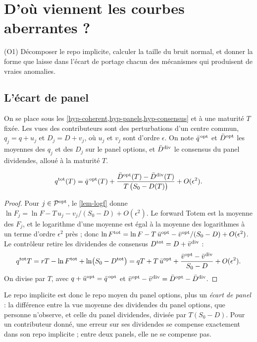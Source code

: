 \section{D'où viennent les courbes aberrantes ?}\label{sec-diagnostic}

\begin{objectif}
(O1) Décomposer le repo implicite, calculer la taille du bruit normal, et donner la forme que laisse dans l'écart de
portage chacun des mécanismes qui produisent de vraies anomalies.
\end{objectif}

\subsection{L'écart de panel}\label{sec-gap}
On se place sous les \cref{hyp-coherent,hyp-panels,hyp-consensus} et à une maturité $T$ fixée. Les vues des
contributeurs sont des perturbations d'un centre commun, $q_j=q+u_j$ et $D_j=D+v_j$, où $u_j$ et $v_j$ sont d'ordre
$\epsilon$. On note $\bar q^{\,\mathrm{opt}}$ et $\bar D^{\mathrm{opt}}$ les moyennes des $q_j$ et des $D_j$ sur le panel options, et $\bar D^{\mathrm{div}}$ le
consensus du panel dividendes, alloué à la maturité $T$.

\begin{proposition}\label{prop-gap}
\begin{equation}\label{eq-gap}
q^{\mathrm{tot}}(T)=\bar q^{\,\mathrm{opt}}(T)+\frac{\bar D^{\mathrm{opt}}(T)-\bar D^{\mathrm{div}}(T)}{T\,\bigl(S_0-D(T)\bigr)}+O(\epsilon^2).
\end{equation}
\end{proposition}
\begin{proof}
Pour $j\in\mathcal{P}^{\mathrm{opt}}$, le \cref{lem-logf} donne $\ln F_j=\ln F-T\,u_j-v_j/(S_0-D)+O(\epsilon^2)$. Le forward Totem est la
moyenne des $F_j$, et le logarithme d'une moyenne est égal à la moyenne des logarithmes à un terme d'ordre $\epsilon^2$
près ; donc $\ln F^{\mathrm{tot}}=\ln F-T\,\bar u^{\mathrm{opt}}-\bar v^{\mathrm{opt}}/(S_0-D)+O(\epsilon^2)$. Le contrôleur retire les
dividendes de consensus $D^{\mathrm{tot}}=D+\bar v^{\mathrm{div}}$ :
\[
q^{\mathrm{tot}}T=rT-\ln F^{\mathrm{tot}}+\ln\bigl(S_0-D^{\mathrm{tot}}\bigr)=qT+T\,\bar u^{\mathrm{opt}}+\frac{\bar v^{\mathrm{opt}}-\bar v^{\mathrm{div}}}{S_0-D}
+O(\epsilon^2).
\]
On divise par $T$, avec $q+\bar u^{\mathrm{opt}}=\bar q^{\,\mathrm{opt}}$ et $\bar v^{\mathrm{opt}}-\bar v^{\mathrm{div}}=\bar D^{\mathrm{opt}}-\bar D^{\mathrm{div}}$.
\end{proof}

Le repo implicite est donc le repo moyen du panel options, plus un \emph{écart de panel} : la différence entre la vue
moyenne des dividendes du panel options, que personne n'observe, et celle du panel dividendes, divisée par
$T(S_0-D)$. Pour un contributeur donné, une erreur sur ses dividendes se compense exactement dans son repo implicite ;
entre deux panels, elle ne se compense pas.


